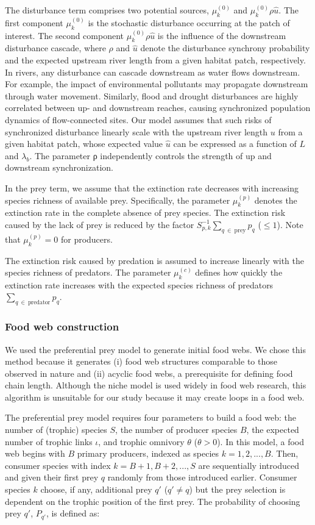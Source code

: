 \documentclass[11pt, class=article, crop=false]{standalone}
\begin{document}
The disturbance term comprises two potential sources, $\mu^{(0)}_k$ and $\mu^{(0)}_k \rho \hat{u}$.
The first component $\mu^{(0)}_k$ is the stochastic disturbance occurring at the patch of interest.
The second component $\mu^{(0)}_k \rho \hat{u}$ is the influence of the downstream disturbance cascade, where $\rho$ and $\hat{u}$ denote the disturbance synchrony probability and the expected upstream river length from a given habitat patch, respectively.
In rivers, any disturbance can cascade downstream as water flows downstream.
For example, the impact of environmental pollutants may propagate downstream through water movement.
Similarly, flood and drought disturbances are highly correlated between up- and downstream reaches, causing synchronized population dynamics of flow-connected sites.
Our model assumes that such risks of synchronized disturbance linearly scale with the upstream river length $u$ from a given habitat patch, whose expected value $\hat{u}$ can be expressed as a function of $L$ and $\lambda_b$.
The parameter ρ independently controls the strength of up and
downstream synchronization.

In the prey term, we assume that the extinction rate decreases with increasing species richness of available prey.
Specifically, the parameter $\mu_{k}^{(p)}$ denotes the extinction rate in the complete absence of prey species.
The extinction risk caused by the lack of prey is reduced by the factor $S_{p, k}^{-1} \sum_{q~\in~\text{prey}} p_{q}$ ($\le 1$).
Note that $\mu_{k}^{(p)} = 0$ for producers.

The extinction risk caused by predation is assumed to increase linearly with the species richness of predators.
The parameter $\mu_{k}^{(c)}$ defines how quickly the extinction rate increases with the expected species richness of predators $\sum_{q~\in~\text{predator}} p_{q}$.

\subsubsection{Food web construction}

We used the preferential prey model to generate initial food webs.
We chose this method because it generates (i) food web structures comparable to those observed in nature and (ii) acyclic food webs, a prerequisite for defining food chain length.
Although the niche model is used widely in food web research, this algorithm is unsuitable for our study because it may create loops in a food web.

The preferential prey model requires four parameters to build a food web: the number of (trophic) species $S$, the number of producer species $B$, the expected number of trophic links $\iota$, and trophic omnivory $\theta$ ($\theta > 0$).
In this model, a food web begins with $B$ primary producers, indexed as species $k = 1, 2, ..., B$.
Then, consumer species with index $k = B + 1, B + 2, ..., S$ are sequentially introduced and given their first prey $q$ randomly from those introduced earlier.
Consumer species $k$ choose, if any, additional prey $q'$ ($q' \ne q$) but the prey selection is dependent on the trophic position of the first prey.
The probability of choosing prey $q'$, $P_{q'}$, is defined as:
\end{document}
